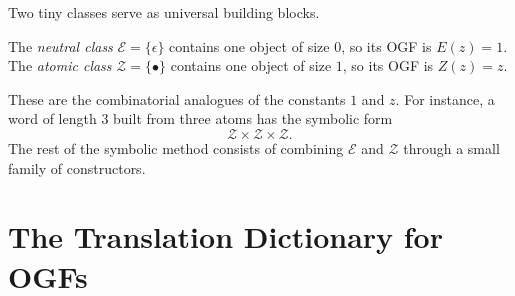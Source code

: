 \begin{center}
\end{center}

Two tiny classes serve as universal building blocks.

\begin{definition}
The \emph{neutral class} $\mathcal{E} = \{\epsilon\}$ contains one object of size $0$, so its OGF is $E(z)=1$. The \emph{atomic class} $\mathcal{Z} = \{\bullet\}$ contains one object of size $1$, so its OGF is $Z(z)=z$.
\end{definition}

These are the combinatorial analogues of the constants $1$ and $z$. For instance, a word of length $3$ built from three atoms has the symbolic form
\[
  \mathcal{Z} \times \mathcal{Z} \times \mathcal{Z}.
\]
The rest of the symbolic method consists of combining $\mathcal{E}$ and $\mathcal{Z}$ through a small family of constructors.

\section{The Translation Dictionary for OGFs}

